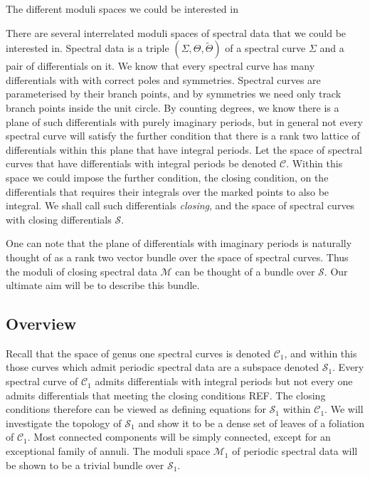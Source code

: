 The different moduli spaces we could be interested in

There are several interrelated moduli spaces of spectral data that we could be interested in. Spectral data is a triple $(Σ,Θ,\tilde{Θ})$ of a spectral curve $Σ$ and a pair of differentials on it. We know that every spectral curve has many differentials with with correct poles and symmetries. Spectral curves are parameterised by their branch points, and by symmetries we need only track branch points inside the unit circle. By counting degrees, we know there is a plane of such differentials with purely imaginary periods, but in general not every spectral curve will satisfy the further condition that there is a rank two lattice of differentials within this plane that have integral periods. Let the space of spectral curves that have differentials with integral periods be denoted $\mathcal{C}$. Within this space we could impose the further condition, the closing condition, on the differentials that requires their integrals over the marked points to also be integral. We shall call such differentials \emph{closing}, and the space of spectral curves with closing differentials $\mathcal{S}$.

One can note that the plane of differentials with imaginary periods is naturally thought of as a rank two vector bundle over the space of spectral curves. Thus the moduli of closing spectral data $\mathcal{M}$ can be thought of a bundle over $\mathcal{S}$. Our ultimate aim will be to describe this bundle.










\subsection{Overview}
\label{sub:Overview}

Recall that the space of genus one spectral curves is denoted $\mathcal{C}_1$, and within this those curves which admit periodic spectral data are a subspace denoted $\mathcal{S}_1$. Every spectral curve of $\mathcal{C}_1$ admits differentials with integral periods but not every one admits differentials that meeting the closing conditions REF. The closing conditions therefore can be viewed as defining equations for $\mathcal{S}_1$ within $\mathcal{C}_1$. We will investigate the topology of $\mathcal{S}_1$ and show it to be a dense set of leaves of a foliation of $\mathcal{C}_1$. Most connected components will be simply connected, except for an exceptional family of annuli. The moduli space $\mathcal{M}_1$ of periodic spectral data will be shown to be a trivial bundle over $\mathcal{S}_1$.

